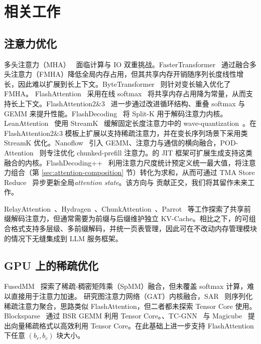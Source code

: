\section{相关工作}
\label{sec:related-work}

\subsection{注意力优化}

多头注意力（MHA）~\citep{vaswani2017transformer} 面临计算与 IO 双重挑战。FasterTransformer~\citep{fastertransformer} 通过融合多头注意力（FMHA）降低全局内存占用，但其共享内存开销随序列长度线性增长，因此难以扩展到长上下文。ByteTransformer~\citep{zhai2023bytetransformer} 则针对变长输入优化了 FMHA。
FlashAttention~\citep{dao2022flashattention} 采用在线 softmax~\citep{milakov2018onlinesoftmax} 将共享内存占用降为常量，从而支持长上下文。FlashAttention2\&3~\citep{dao2023flashattention2,jay2024flashattention3} 进一步通过改进循环结构、重叠 softmax 与 GEMM 来提升性能。FlashDecoding~\cite{dao2023flash-decoding} 将 Split-K 用于解码注意力内核。LeanAttention~\cite{sanovar2024lean} 使用 StreamK~\citep{osama2023streamk} 缓解固定长度注意力中的 wave-quantization~\citep{wave-quantization}。\sys 在 FlashAttention2\&3 模板上扩展以支持稀疏注意力，并在变长序列场景下采用类 StreamK 优化。Nanoflow~\citep{zhu2024nanoflow} 引入 GEMM、注意力与通信的横向融合，POD-Attention~\citep{kamath2024podattention} 则专注优化 chunked-prefill 注意力。\sys 的 JIT 框架可扩展生成支持这类融合的内核。FlashDecoding++~\citep{flashdecodingpp} 利用注意力尺度统计预定义统一最大值，将注意力组合（第 \ref{sec:attention-composition} 节）转化为求和，从而可通过 TMA Store Reduce~\citep{tma-store-reduce} 异步更新全局\textit{attention state}。该方向与 \sys 贡献正交，我们将其留作未来工作。

RelayAttention~\citep{zhu2024relayattention}、Hydragen~\citep{juravsky2024hydra}、ChunkAttention~\citep{ye2024chunkattention}、Parrot~\citep{lin2024parrot} 等工作探索了共享前缀解码注意力，但通常需要为前缀与后缀维护独立 KV-Cache。相比之下，\sys 的可组合格式支持多层级、多前缀解码，并统一页表管理，因此可在不改动内存管理模块的情况下无缝集成到 LLM 服务框架。

\subsection{GPU 上的稀疏优化}

FusedMM~\citep{rahman2021fusedmm} 探索了稀疏-稠密矩阵乘（SpMM）融合，但未覆盖 softmax 计算，难以直接用于注意力加速。\citet{zhang2022fusedgat} 研究图注意力网络（GAT）内核融合，SAR~\citep{mostafa2022sar} 则序列化稀疏注意力聚合，思路类似 FlashAttention，但二者都未探索 Tensor Core 使用。Blocksparse~\citep{gray2017gpu-bsr} 通过 BSR GEMM 利用 Tensor Core。\citet{chen2021tensorcoressparsity}、TC-GNN~\citep{wang2023tcgnn} 与 Magicube~\citep{li2022magicube} 提出向量稀疏格式以高效利用 Tensor Core。\sys 在此基础上进一步支持 FlashAttention 下任意 $(b_r,b_c)$ 块大小。

